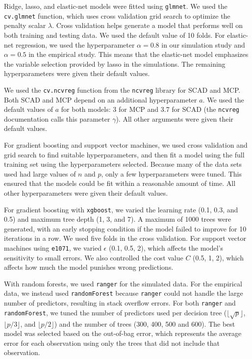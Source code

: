 \documentclass[final,onefignum,onetabnum]{siuro210301}
\begin{document}
	Ridge, lasso, and elastic-net models were fitted using \lstinline!glmnet!. We used the \lstinline!cv.glmnet! function, which uses cross validation grid search to optimize the penalty scalar $\lambda$. Cross validation helps generate a model that performs well on both training and testing data. We used the default value of 10 folds. For elastic-net regression, we used the hyperparameter $\alpha = 0.8$ in our simulation study and $\alpha = 0.5$ in the empirical study. This means that the elastic-net model emphasizes the variable selection provided by lasso in the simulations. The remaining hyperparameters were given their default values.
	
	We used the \lstinline!cv.ncvreg! function from the \lstinline!ncvreg! library for SCAD and MCP. Both SCAD and MCP depend on an additional hyperparameter $a$. We used the default values of $a$ for both models: 3 for MCP and 3.7 for SCAD (the \lstinline!ncvreg! documentation calls this parameter $\gamma$). All other arguments were given their default values. 
	
	For gradient boosting and support vector machines, we used cross validation and grid search to find suitable hyperparameters, and then fit a model using the full training set using the hyperparameters selected. Because many of the data sets used had large values of $n$ and $p$, only a few hyperparameters were tuned. This ensured that the models could be fit within a reasonable amount of time. All other hyperparameters were given their default values.
	
	For gradient boosting with \lstinline!xgboost!, we varied the learning rate (0.1, 0.3, and 0.5) and maximum tree depth (1, 3, and 7). A maximum of 1000 trees were generated, with an early stopping condition if the model failed to improve for 10 iterations in a row. We used five folds in the cross validation. For support vector machines using \lstinline!e1071!, we varied $\epsilon$ (0.1, 0.5, 2), which affects the model's sensitivity to small errors. We also controlled the cost value $C$ (0.5, 1, 2), which affects how much the model punishes wrong predictions.
	
	With random forests, we used \lstinline!ranger! for the simulated data. For the empirical data, we instead used \lstinline!randomForest! because \lstinline!ranger! could not handle the large number of predictors, resulting in stack overflow errors. For both \lstinline!ranger! and \lstinline!randomForest!, we tuned the number of predictors used per decision tree ($\lfloor \sqrt{p}\rfloor$, $\lfloor p / 3 \rfloor$, and $\lfloor p / 2 \rfloor$) and the number of trees (300, 400, 500 and 600). The best model was selected based on the out-of-bag error, which represents the average error for each observation using only the trees that did not include that observation.
	
\end{document}
